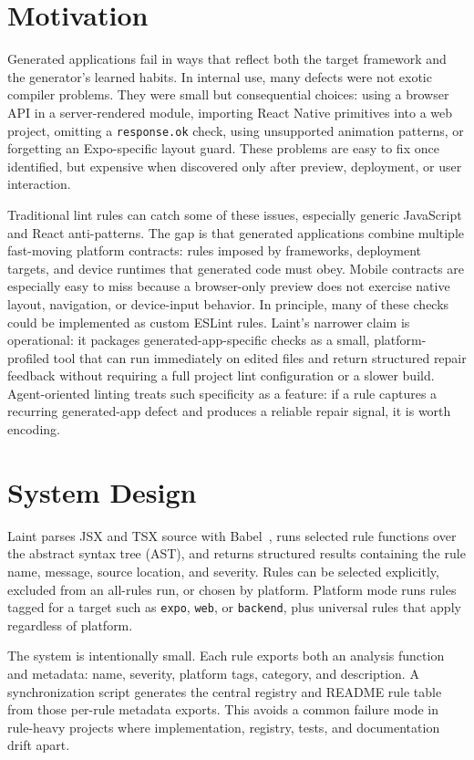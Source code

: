 \documentclass[11pt]{article}
\begin{document}
\section{Motivation}

Generated applications fail in ways that reflect both the target framework and the generator's learned habits. In internal use, many defects were not exotic compiler problems. They were small but consequential choices: using a browser API in a server-rendered module, importing React Native primitives into a web project, omitting a \texttt{response.ok} check, using unsupported animation patterns, or forgetting an Expo-specific layout guard. These problems are easy to fix once identified, but expensive when discovered only after preview, deployment, or user interaction.

Traditional lint rules can catch some of these issues, especially generic JavaScript and React anti-patterns. The gap is that generated applications combine multiple fast-moving platform contracts: rules imposed by frameworks, deployment targets, and device runtimes that generated code must obey. Mobile contracts are especially easy to miss because a browser-only preview does not exercise native layout, navigation, or device-input behavior. In principle, many of these checks could be implemented as custom ESLint rules. Laint's narrower claim is operational: it packages generated-app-specific checks as a small, platform-profiled tool that can run immediately on edited files and return structured repair feedback without requiring a full project lint configuration or a slower build. Agent-oriented linting treats such specificity as a feature: if a rule captures a recurring generated-app defect and produces a reliable repair signal, it is worth encoding.

\section{System Design}

Laint parses JSX and TSX source with Babel~\cite{babel}, runs selected rule functions over the abstract syntax tree (AST), and returns structured results containing the rule name, message, source location, and severity. Rules can be selected explicitly, excluded from an all-rules run, or chosen by platform. Platform mode runs rules tagged for a target such as \texttt{expo}, \texttt{web}, or \texttt{backend}, plus universal rules that apply regardless of platform.

The system is intentionally small. Each rule exports both an analysis function and metadata: name, severity, platform tags, category, and description. A synchronization script generates the central registry and README rule table from those per-rule metadata exports. This avoids a common failure mode in rule-heavy projects where implementation, registry, tests, and documentation drift apart.
\end{document}
